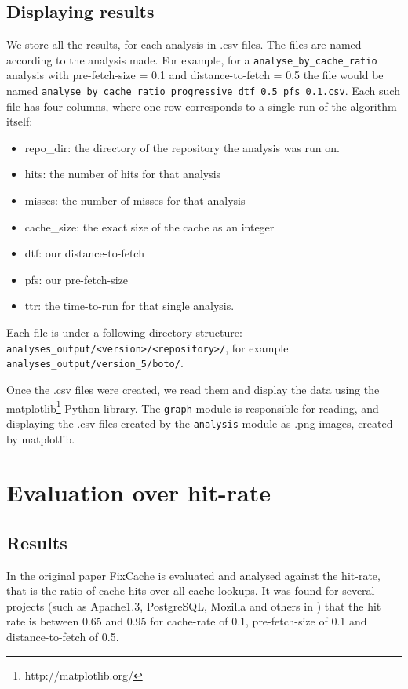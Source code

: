 \documentclass[12pt,twoside,notitlepage]{report}
\newcommand{\fxch}{FixCache }
\begin{document}
\subsection{Displaying results}
We store all the results, for each analysis in .csv files. The files are named according to the analysis made. For example, for a \texttt{analyse\_by\_cache\_ratio} analysis with pre-fetch-size = 0.1 and distance-to-fetch = 0.5 the file would be named \texttt{analyse\_by\_cache\_ratio\_progressive\_dtf\_0.5\_pfs\_0.1.csv}. Each such file has four columns, where one row corresponds to a single run of the algorithm itself: 
\begin{itemize}
\item repo\_dir: the directory of the repository the analysis was run on.
\item hits: the number of hits for that analysis
\item misses: the number of misses for that analysis
\item cache\_size: the exact size of the cache as an integer
\item dtf: our distance-to-fetch
\item pfs: our pre-fetch-size
\item ttr: the time-to-run for that single analysis.
\end{itemize}
Each file is under a following directory structure: \texttt{analyses\_output/<version>/<repository>/}, for example \texttt{analyses\_output/version\_5/boto/}.

Once the .csv files were created, we read them and display the data using the matplotlib\footnote{http://matplotlib.org/} Python library. The \texttt{graph} module is responsible for reading, and displaying the .csv files created by the \texttt{analysis} module as .png images, created by matplotlib.
\section{Evaluation over hit-rate}
\subsection{Results}
In the original paper \fxch is evaluated and analysed against the hit-rate, that is the ratio of cache hits over all cache lookups. It was found for several projects (such as Apache1.3, PostgreSQL, Mozilla and others in \cite{FixCache}) that the hit rate is between 0.65 and 0.95 for cache-rate of 0.1, pre-fetch-size of 0.1 and distance-to-fetch of 0.5.
\end{document}
